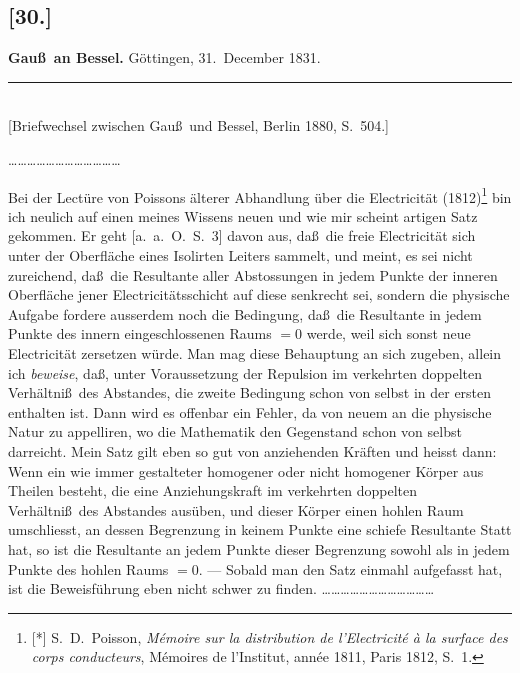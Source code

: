 \documentclass[12pt,a4paper]{article}
\theoremstyle{plain}
\theoremstyle{definition}
\theoremstyle{remark}
\begin{document}
\subsection*{[30.]}
\begin{center}
\textbf{Gau\ss\ an Bessel.} G\"ottingen, 31.~December 1831.
\end{center}
\begin{center}
\rule{6cm}{0.4pt}\\[4pt]
[Briefwechsel zwischen Gau\ss\ und Bessel, Berlin 1880, S.~504.]
\end{center}

\smallskip
\ldots\ldots\ldots\ldots\ldots\ldots\ldots\ldots\ldots\ldots\ldots\ldots
\smallskip

Bei der Lect\"ure von {\sc Poissons} \"alterer Abhandlung \"uber die
Electricit\"at (1812)\footnote{[*] S.~D.~{\sc Poisson}, {\it M\'emoire
sur la distribution de l'Electricit\'e \`a la surface des corps
conducteurs}, M\'emoires de l'Institut, ann\'ee 1811, Paris 1812, S.~1.}
bin ich neulich auf einen meines Wissens neuen und wie mir scheint
artigen Satz gekommen. Er geht [a.~a.~O.~S.~3] davon aus, da\ss\ die
freie Electricit\"at sich unter der Oberfl\"ache eines Isolirten
Leiters sammelt, und meint, es sei nicht zureichend, da\ss\ die
Resultante aller Abstossungen in jedem Punkte der inneren
Oberfl\"ache jener Electricit\"atsschicht auf diese senkrecht sei,
sondern die physische Aufgabe fordere ausserdem noch die Bedingung,
da\ss\ die Resultante in jedem Punkte des innern eingeschlossenen
Raums $=0$ werde, weil sich sonst neue Electricit\"at zersetzen
w\"urde. Man mag diese Behauptung an sich zugeben, allein ich
{\it beweise}, da\ss, unter Voraussetzung der Repulsion im
verkehrten doppelten Verh\"altni\ss\ des Abstandes, die zweite
Bedingung schon von selbst in der ersten enthalten ist. Dann wird
es offenbar ein Fehler, da von neuem an die physische Natur zu
appelliren, wo die Mathematik den Gegenstand schon von selbst
darreicht. Mein Satz gilt eben so gut von anziehenden Kr\"aften und
heisst dann: Wenn ein wie immer gestalteter homogener oder nicht
homogener K\"orper aus Theilen besteht, die eine Anziehungskraft im
verkehrten doppelten Verh\"altni\ss\ des Abstandes aus\"uben, und
dieser K\"orper einen hohlen Raum umschliesst, an dessen Begrenzung
in keinem Punkte eine schiefe Resultante Statt hat, so ist die
Resultante an jedem Punkte dieser Begrenzung sowohl als in jedem
Punkte des hohlen Raums $=0$. --- Sobald man den Satz einmahl
aufgefasst hat, ist die Beweisf\"uhrung eben nicht schwer zu finden.
\ldots\ldots\ldots\ldots\ldots\ldots\ldots\ldots\ldots\ldots\ldots\ldots
\end{document}
